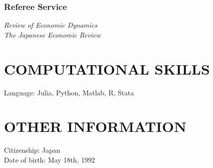 \documentclass[12pt]{article}
\begin{document}
\subsubsection*{Referee Service}
\textit{Review of Economic Dynamics}\\
\textit{The Japanese Economic Review}

\section*{COMPUTATIONAL SKILLS}
Language: Julia, Python, Matlab, R, Stata

\section*{OTHER INFORMATION}
Citizenship: Japan\\
Date of birth: May 18th, 1992
\end{document}
